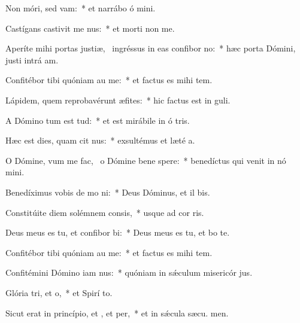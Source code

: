 \item Non móri, sed vam:~* et narrábo ó mini.
\item Castígans castivit me nus:~* et morti non  me.
\item Aperíte mihi portas justiæ,~\pscross{} ingréssus in eas confibor no:~* hæc porta Dómini, justi intrá  am.
\item Confitébor tibi quóniam au me:~* et factus es mihi  tem.
\item Lápidem, quem reprobavérunt æfites:~* hic factus est in  guli.
\item A Dómino tum est tud:~* et est mirábile in ó tris.
\item Hæc est dies, quam cit nus:~* exsultémus et læté  a.
\item O Dómine, vum me fac,~\pscross{} o Dómine bene spere:~* benedíctus qui venit in nó mini.
\item Benedíximus vobis de mo ni:~* Deus Dóminus, et il bis.
\item Constitúite diem solémnem  consis,~* usque ad cor ris.
\item Deus meus es tu, et confibor bi:~* Deus meus es tu, et bo te.
\item Confitébor tibi quóniam au me:~* et factus es mihi  tem.
\item Confitémini Dómino iam nus:~* quóniam in sǽculum misericór jus.
\item Glória tri, et o,~* et Spirí to.
\item Sicut erat in princípio, et , et per,~* et in sǽcula sæcu. men.

